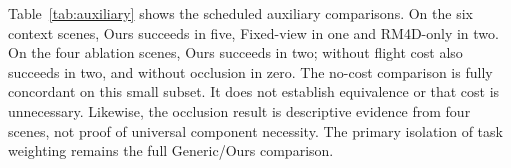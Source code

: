 Table~\ref{tab:auxiliary} shows the scheduled auxiliary comparisons. On the six
context scenes, Ours succeeds in five, Fixed-view in one and RM4D-only in two.
On the four ablation scenes, Ours succeeds in two; without flight cost also
succeeds in two, and without occlusion in zero. The no-cost comparison is fully
concordant on this small subset. It does not establish equivalence or that cost
is unnecessary. Likewise, the occlusion result is descriptive evidence from
four scenes, not proof of universal component necessity. The primary isolation
of task weighting remains the full Generic/Ours comparison.

\begin{table}[tb]
\centering
\caption{Descriptive auxiliary comparisons using scheduled Ours counterparts.
$a,b,c,d$ have the paired meanings of Table~\ref{tab:paired}, replacing Generic
with the listed comparator. Subsets are not powered secondary experiments.}
\label{tab:auxiliary}
\resizebox{\linewidth}{!}{}
\end{table}
